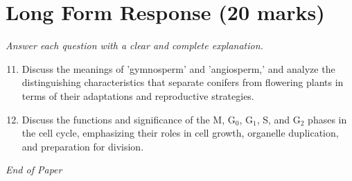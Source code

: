 \documentclass[12pt]{article}
\begin{document}
\section*{Long Form Response (20 marks)}
\textit{Answer each question with a clear and complete explanation.}
\begin{enumerate}[label=\arabic*.]
\setcounter{enumi}{10}
\item Discuss the meanings of 'gymnosperm' and 'angiosperm,' and analyze the distinguishing characteristics that separate conifers from flowering plants in terms of their adaptations and reproductive strategies.
\item Discuss the functions and significance of the M, G$_{0}$, G$_{1}$, S, and G$_{2}$ phases in the cell cycle, emphasizing their roles in cell growth, organelle duplication, and preparation for division.
\end{enumerate}

\vfill
\noindent\textit{End of Paper}
\end{document}
